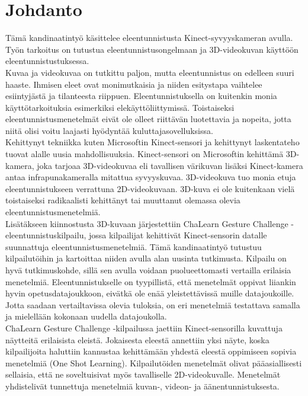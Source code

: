 
\section{Johdanto}

Tämä kandinaatintyö käsittelee eleentunnistusta Kinect-syvyyskameran avulla. 
Työn tarkoitus on tutustua eleentunnistusongelmaan ja 3D-videokuvan käyttöön eleentunnistustuksessa. \\

Kuvaa ja videokuvaa on tutkittu paljon, mutta eleentunnistus on edelleen suuri haaste. Ihmisen eleet
ovat monimutkaisia ja niiden esitystapa vaihtelee esiintyjästä ja tilanteesta riippuen. Eleentunnistuksella
on kuitenkin monia käyttötarkoituksia esimerkiksi elekäyttöliittymissä. \citep{chalearn2} Toistaiseksi
eleentunnistusmenetelmät eivät ole olleet riittävän luotettavia ja nopeita, jotta niitä olisi voitu
laajasti hyödyntää kuluttajasovelluksissa.\\

Kehittynyt tekniikka kuten Microsoftin Kinect-sensori ja kehittynyt laskentateho tuovat alalle uusia mahdollisuuksia. 
Kinect-sensori on Microsoftin kehittämä 3D-kamera, joka tarjoaa 3D-videokuvaa eli tavallisen värikuvan 
lisäksi Kinect-kamera antaa infrapunakameralla mitattua syvyyskuvaa. \citep{kinectkuva}
3D-videokuva tuo monia etuja eleentunnistukseen verrattuna 2D-videokuvaan. 3D-kuva ei ole kuitenkaan 
vielä toistaiseksi radikaalisti kehittänyt tai muuttanut olemassa olevia eleentunnistusmenetelmiä.\\

Lisätäkseen kiinnostusta 3D-kuvaan järjestettiin ChaLearn Gesture Challenge -eleentunnistuskilpailu, 
jossa kilpailijat kehittivät Kinect-sensorin datalle suunnattuja 
eleentunnistusmenetelmiä. Tämä kandinaatintyö tutustuu kilpailutöihin ja kartoittaa niiden avulla alan uusinta tutkimusta. Kilpailu on hyvä tutkimuskohde,
sillä sen avulla voidaan puolueettomasti vertailla erilaisia menetelmiä. Eleentunnistukselle on tyypillistä, 
että menetelmät oppivat liiankin hyvin opetusdatajoukkoon, eivätkä ole enää yleistettävissä muille datajoukoille.
Jotta saadaan vertailtavissa olevia tuloksia, on eri menetelmiä testattava samalla ja mielellään kokonaan uudella datajoukolla.\\

ChaLearn Gesture Challenge -kilpailussa jaettiin Kinect-sensorilla kuvattuja näytteitä erilaisista eleistä.
Jokaisesta eleestä annettiin yksi näyte, koska kilpailijoita haluttiin kannustaa kehittämään yhdestä 
eleestä oppimiseen sopivia menetelmiä (One Shot Learning). Kilpailutöiden menetelmät olivat pääasiallisesti sellaisia,
että ne soveltuisivat myös tavalliselle 2D-videokuvalle. Menetelmät yhdistelivät tunnettuja menetelmiä kuvan-, videon- ja äänentunnistuksesta.\\

